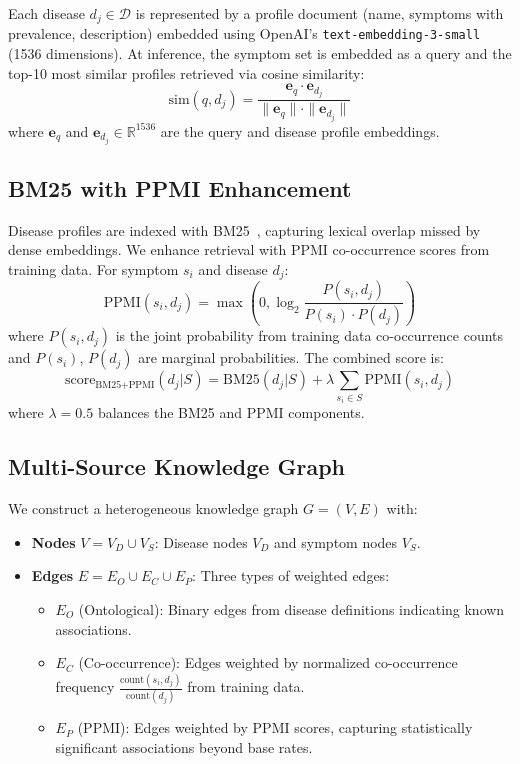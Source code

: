 \documentclass[preprint,12pt]{elsarticle}
\begin{document}
Each disease $d_j \in \mathcal{D}$ is represented by a profile document (name, symptoms with prevalence, description) embedded using OpenAI's \texttt{text-embedding-3-small} (1536 dimensions). At inference, the symptom set is embedded as a query and the top-10 most similar profiles retrieved via cosine similarity:
\begin{equation}
    \text{sim}(q, d_j) = \frac{\mathbf{e}_q \cdot \mathbf{e}_{d_j}}{\|\mathbf{e}_q\| \cdot \|\mathbf{e}_{d_j}\|}
\end{equation}
where $\mathbf{e}_q$ and $\mathbf{e}_{d_j} \in \mathbb{R}^{1536}$ are the query and disease profile embeddings.

\subsection{BM25 with PPMI Enhancement}
\label{sec:bm25}

Disease profiles are indexed with BM25~\cite{robertson2009probabilistic}, capturing lexical overlap missed by dense embeddings. We enhance retrieval with PPMI co-occurrence scores from training data. For symptom $s_i$ and disease $d_j$:
\begin{equation}
    \text{PPMI}(s_i, d_j) = \max\left(0, \log_2 \frac{P(s_i, d_j)}{P(s_i) \cdot P(d_j)}\right)
\end{equation}
where $P(s_i, d_j)$ is the joint probability from training data co-occurrence counts and $P(s_i)$, $P(d_j)$ are marginal probabilities. The combined score is:
\begin{equation}
    \text{score}_{\text{BM25+PPMI}}(d_j | S) = \text{BM25}(d_j | S) + \lambda \sum_{s_i \in S} \text{PPMI}(s_i, d_j)
\end{equation}
where $\lambda = 0.5$ balances the BM25 and PPMI components.

\subsection{Multi-Source Knowledge Graph}
\label{sec:kg}

We construct a heterogeneous knowledge graph $G = (V, E)$ with:
\begin{itemize}
    \item \textbf{Nodes} $V = V_D \cup V_S$: Disease nodes $V_D$ and symptom nodes $V_S$.
    \item \textbf{Edges} $E = E_O \cup E_C \cup E_P$: Three types of weighted edges:
    \begin{itemize}
        \item $E_O$ (Ontological): Binary edges from disease definitions indicating known associations.
        \item $E_C$ (Co-occurrence): Edges weighted by normalized co-occurrence frequency $\frac{\text{count}(s_i, d_j)}{\text{count}(d_j)}$ from training data.
        \item $E_P$ (PPMI): Edges weighted by PPMI scores, capturing statistically significant associations beyond base rates.
    \end{itemize}
\end{itemize}
\end{document}
